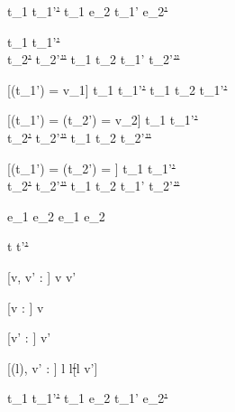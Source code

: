   {t_1\st{} \normalise t_1'\st{'}}
  {t_1 \Next e_2\st{} \normalise t_1' \Next e_2\st{'}}


  {t_1\st{}  \normalise t_1'\st{'} \\
   t_2\st{'} \normalise t_2'\st{''}}
  {t_1 \And t_2\st{} \normalise t_1' \And t_2'\st{''}}


[\Value(t_1') = v_1]
  {t_1\st{}  \normalise t_1'\st{'}}
  {t_1 \Or t_2\st{} \normalise t_1'\st{'}}

[\Value(t_1') = \bot \land \Value(t_2') = v_2]
  {t_1\st{}  \normalise t_1'\st{'} \\
   t_2\st{'} \normalise t_2'\st{''}}
  {t_1 \Or t_2\st{} \normalise t_2'\st{''}}

[\Value(t_1') = \bot \land \Value(t_2') = \bot]
  {t_1\st{}  \normalise t_1'\st{'} \\
   t_2\st{'} \normalise t_2'\st{''}}
  {t_1 \Or t_2\st{} \normalise t_1' \Or t_2'\st{''}}


  { }
  {e_1 \Xor e_2\st{} \normalise e_1 \Xor e_2\st{}}








  {t\st{}  t'\st{'}}


[v, v' : \beta]
  { }
  {\Edit v\st{}  \Edit v'\st{}}

[v : \beta]
  { }
  {\Edit v\st{} \handle{\Clear} \Enter \beta\st{}}

[v' : \beta]
  { }
  {\Enter \beta\st{}  \Edit v'\st{}}

[\Sigma(l), v' : \beta]
  { }
  {\Store l\st{}  \Store l\st[l \mapsto v']{}}


  { }
  {\Fail\st{}  \Fail\st{}}


  {t_1\st{}  t_1'\st{'}}
  {t_1 \Then e_2\st{}  t_1' \Then e_2\st{'}}

